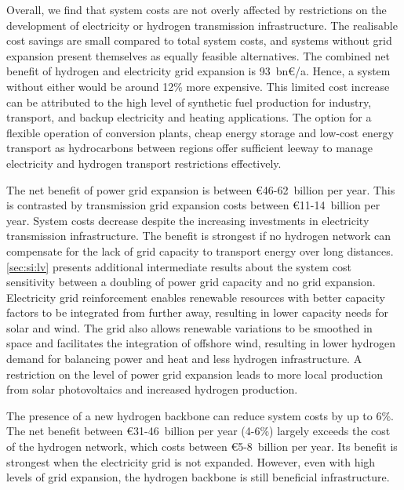 
Overall, we find that system costs are not overly affected by restrictions on
the development of electricity or hydrogen transmission infrastructure. The
realisable cost savings are small compared to total system costs, and systems
without grid expansion present themselves as equally feasible alternatives. The
combined net benefit of hydrogen and electricity grid expansion is 93~bn\euro/a.
Hence, a system without either would be around 12\% more expensive. This limited
cost increase can be attributed to the high level of synthetic fuel production
for industry, transport, and backup electricity and heating applications. The
option for a flexible operation of conversion plants, cheap energy storage and
low-cost energy transport as hydrocarbons between regions offer sufficient
leeway to manage electricity and hydrogen transport restrictions effectively.


The net benefit of power grid expansion is between \euro46-62~billion per year.
This is contrasted by transmission grid expansion costs between
\euro11-14~billion per year. System costs decrease despite the increasing
investments in electricity transmission infrastructure. The benefit is strongest
if no hydrogen network can compensate for the lack of grid capacity to transport
energy over long distances. \cref{sec:si:lv} presents additional intermediate
results about the system cost sensitivity between a doubling of power grid
capacity and no grid expansion. Electricity grid reinforcement enables renewable
resources with better capacity factors to be integrated from further away,
resulting in lower capacity needs for solar and wind. The grid also allows
renewable variations to be smoothed in space and facilitates the integration of
offshore wind, resulting in lower hydrogen demand for balancing power and heat
and less hydrogen infrastructure. A restriction on the level of power grid
expansion leads to more local production from solar photovoltaics and increased
hydrogen production.


The presence of a new hydrogen backbone can reduce system costs by up to 6\%.
The net benefit between \euro31-46~billion per year (4-6\%) largely exceeds the
cost of the hydrogen network, which costs between \euro5-8~billion per year. Its
benefit is strongest when the electricity grid is not expanded. However, even
with high levels of grid expansion, the hydrogen backbone is still beneficial
infrastructure.

